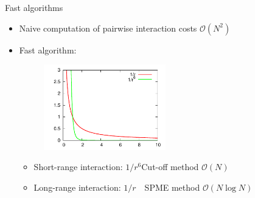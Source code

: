 \documentclass{beamer}
\newcommand{\redc}[1]{{\color{red} #1}}
\newcommand{\bluec}[1]{{\color{blue} #1}}
\begin{document}
\begin{frame}{Fast algorithms}
  \begin{itemize}
  \item<1-> Naive computation of pairwise interaction costs \redc{$\mathcal O(N^2)$}
  \item<2-> Fast algorithm:
    \begin{figure}
      \centering 
      \includegraphics[width=0.5\textwidth]{figs/long-range/decay.pdf}
    \end{figure}
    \begin{itemize}
    \item<3-> Short-range interaction: \bluec{$1/r^6$}\quad Cut-off method \redc{$\mathcal O(N)$}
    \item<4-> Long-range interaction: \bluec{$1/r$}\quad \ \ SPME method \redc{$\mathcal O(N \log N)$}
    \end{itemize}
  \end{itemize}
\end{frame}
\end{document}
